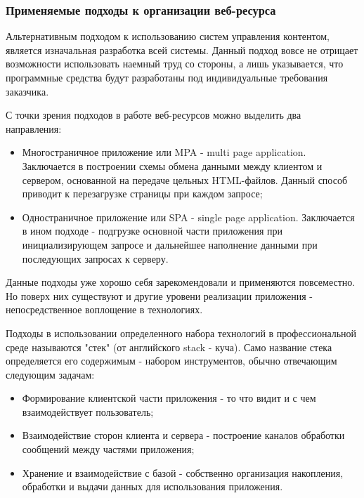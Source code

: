     \subsubsection{Применяемые подходы к организации веб-ресурса}
        Альтернативным подходом к использованию систем управления контентом, является изначальная разработка всей системы.
        Данный подход вовсе не отрицает возможности использовать наемный труд со стороны, а лишь указывается, что программные средства будут разработаны под индивидуальные требования заказчика.

        С точки зрения подходов в работе веб-ресурсов можно выделить два направления:
        \begin{itemize}
            \item Многостраничное приложение или MPA - multi page application.
            Заключается в построении схемы обмена данными между клиентом и сервером, основанной на передаче цельных HTML-файлов.
            Данный способ приводит к перезагрузке страницы при каждом запросе;
            \item Одностраничное приложение или SPA - single page application.
            Заключается в ином подходе - подгрузке основной части приложения при инициализирующем запросе и дальнейшее наполнение данными при последующих запросах к серверу.
        \end{itemize}

        Данные подходы уже хорошо себя зарекомендовали и применяются повсеместно.
        Но поверх них существуют и другие уровени реализации приложения - непосредственное воплощение в технологиях.

        Подходы в использовании определенного набора технологий в профессиональной среде называются "стек" (от английского stack - куча).
        Само название стека определяется его содержимым - набором инструментов, обычно отвечающим следующим задачам:
        \begin{itemize}
            \item Формирование клиентской части приложения - то что видит и с чем взаимодействует пользователь;
            \item Взаимодействие сторон клиента и сервера - построение каналов обработки сообщений между частями приложения;
            \item Хранение и взаимодействие с базой - собственно организация накопления, обработки и выдачи данных для использования приложения.
        \end{itemize}

